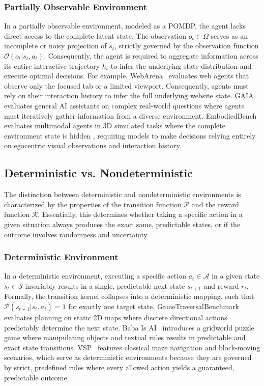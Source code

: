 \documentclass{llmxive}
\begin{document}
\subsubsection{Partially Observable Environment}
In a partially observable environment, modeled as a POMDP, the agent lacks direct access to the complete latent state. The observation $o_t \in \Omega$ serves as an incomplete or noisy projection of $s_t$, strictly governed by the observation function $\mathcal{O}(o_t | s_t, a_t)$. Consequently, the agent is required to aggregate information across its entire interactive trajectory $h_t$ to infer the underlying state distribution and execute optimal decisions. For example, WebArena~\cite{WebArena} evaluates web agents that observe only the focused tab or a limited viewport. Consequently, agents must rely on their interaction history to infer the full underlying website state. GAIA~\cite{GAIA} evaluates general AI assistants on complex real-world questions where agents must iteratively gather information from a diverse environment. EmbodiedBench~\cite{EmbodiedBench} evaluates multimodal agents in 3D simulated tasks where the complete environment state is hidden , requiring models to make decisions relying entirely on egocentric visual observations and interaction history.


\subsection{Deterministic vs. Nondeterministic}
\label{attribute:Deterministic vs. Nondeterministic}
The distinction between deterministic and nondeterministic environments is characterized by the properties of the transition function $\mathcal{P}$ and the reward function $\mathcal{R}$. Essentially, this determines whether taking a specific action in a given situation always produces the exact same, predictable states, or if the outcome involves randomness and uncertainty.

\subsubsection{Deterministic Environment}
In a deterministic environment, executing a specific action $a_t \in \mathcal{A}$ in a given state $s_t \in \mathcal{S}$ invariably results in a single, predictable next state $s_{t+1}$ and reward $r_t$. Formally, the transition kernel collapses into a deterministic mapping, such that $\mathcal{P}(s_{t+1} | s_t, a_t) = 1$ for exactly one target state. GameTraversalBenchmark~\cite{GameTraversalBenchmark} evaluates planning on static 2D maps where discrete directional actions predictably determine the next state. Baba Is AI~\cite{BabaIsAI} introduces a gridworld puzzle game where manipulating objects and textual rules results in predictable and exact state transitions. 
VSP~\cite{Vsp} features classical maze navigation and block-moving scenarios, which serve as deterministic environments because they are governed by strict, predefined rules where every allowed action yields a guaranteed, predictable outcome.
\end{document}
